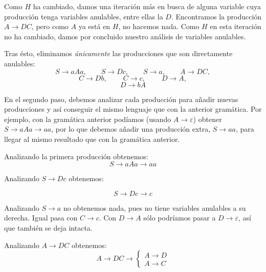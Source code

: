 \documentclass[10pt,a4paper,spanish]{report}
\begin{document}
\begin{enumerate}[a)]
Como $H$ ha cambiado, damos una iteración más en busca de alguna variable cuya producción tenga variables anulables, entre ellas la $D$. Encontramos la producción $A \rightarrow DC$, pero como $A$ ya está en $H$, no hacemos nada. Como $H$ en esta iteración no ha cambiado, damos por concluido nuestro análisis de variables anulables. 

Tras ésto, eliminamos \textit{\textcolor{p9}{únicamente}} las producciones que son directamente anulables:
  \begin{displaymath}
    S \rightarrow aAa, \qquad S \rightarrow Dc, \qquad S \rightarrow a, \qquad A \rightarrow DC,
\end{displaymath}
\begin{displaymath}
    C \rightarrow Db, \qquad\ C \rightarrow c, \qquad\ D \rightarrow A, 
\end{displaymath}
\begin{displaymath}
    D \rightarrow bA
\end{displaymath}

En el segundo paso, debemos analizar cada producción para añadir nuevas producciones y así conseguir el mismo lenguaje que con la anterior gramática. Por ejemplo, con la gramática anterior podíamos (usando $A \rightarrow \varepsilon$) obtener $S \rightarrow aAa \rightarrow aa$, por lo que debemos añadir una producción extra, $S \rightarrow aa$, para llegar al mismo resultado que con la gramática anterior.

Analizando la primera producción obtenemos:
\begin{displaymath}
S \rightarrow aAa \rightarrow aa
\end{displaymath}

Analizando $S \rightarrow Dc$ obtenemos:

\begin{displaymath}
S \rightarrow Dc \rightarrow c
\end{displaymath}

Analizando $S \rightarrow a$ no obtenemos nada, pues no tiene variables anulables a su derecha. Igual pasa con $C \rightarrow c$. Con $D \rightarrow A$ sólo podríamos pasar a $D \rightarrow \varepsilon$, así que también se deja intacta.

Analizando $A \rightarrow DC$ obtenemos:
\begin{equation*}
A \rightarrow DC \rightarrow \left\{
\begin{array}{l}
A \rightarrow D\\
A \rightarrow C
\end{array} \right.
\end{equation*}


\end{enumerate}
\end{document}
